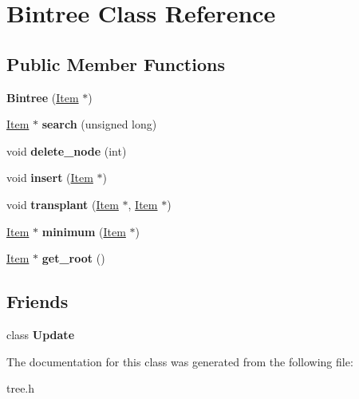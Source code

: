 \hypertarget{class_bintree}{\section{Bintree Class Reference}
\label{class_bintree}
}
\subsection*{Public Member Functions}
\begin{DoxyCompactItemize}
\item 
\hypertarget{class_bintree_af814eecb711f9034a4c4202597e84e19}{{\bfseries Bintree} (\hyperlink{class_item}{Item} $\ast$)}\label{class_bintree_af814eecb711f9034a4c4202597e84e19}

\item 
\hypertarget{class_bintree_a6cf7941584a9ebfcb5027a849fa72e9e}{\hyperlink{class_item}{Item} $\ast$ {\bfseries search} (unsigned long)}\label{class_bintree_a6cf7941584a9ebfcb5027a849fa72e9e}

\item 
\hypertarget{class_bintree_a1096a4a7952d52b88d8159eeaf435c0b}{void {\bfseries delete\-\_\-node} (int)}\label{class_bintree_a1096a4a7952d52b88d8159eeaf435c0b}

\item 
\hypertarget{class_bintree_ad8d4dc72e4a33b52264fc0bfb5d94b35}{void {\bfseries insert} (\hyperlink{class_item}{Item} $\ast$)}\label{class_bintree_ad8d4dc72e4a33b52264fc0bfb5d94b35}

\item 
\hypertarget{class_bintree_a78ef5e23768f407ee488341140c7a6fb}{void {\bfseries transplant} (\hyperlink{class_item}{Item} $\ast$, \hyperlink{class_item}{Item} $\ast$)}\label{class_bintree_a78ef5e23768f407ee488341140c7a6fb}

\item 
\hypertarget{class_bintree_ae92482eea09e46735f311b379b9e19cf}{\hyperlink{class_item}{Item} $\ast$ {\bfseries minimum} (\hyperlink{class_item}{Item} $\ast$)}\label{class_bintree_ae92482eea09e46735f311b379b9e19cf}

\item 
\hypertarget{class_bintree_a2d5216be079f6099a3996418cf5db1d5}{\hyperlink{class_item}{Item} $\ast$ {\bfseries get\-\_\-root} ()}\label{class_bintree_a2d5216be079f6099a3996418cf5db1d5}

\end{DoxyCompactItemize}
\subsection*{Friends}
\begin{DoxyCompactItemize}
\item 
\hypertarget{class_bintree_a2cedee6ab0da841755431efd84ad466b}{class {\bfseries Update}}\label{class_bintree_a2cedee6ab0da841755431efd84ad466b}

\end{DoxyCompactItemize}


The documentation for this class was generated from the following file\-:\begin{DoxyCompactItemize}
\item 
tree.\-h\end{DoxyCompactItemize}
